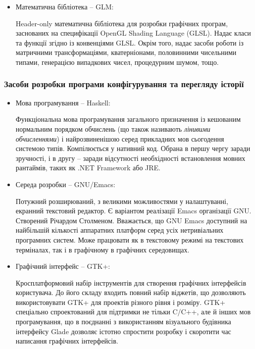 \begin{itemize}[label=\Large$\diamond$]
  \item Математична бібліотека -- GLM:

    Header-only математична бібліотека для розробки графічних програм, заснованих на специфікації OpenGL Shading Language (GLSL). Надає класи та функції згідно із конвенціями GLSL. Окрім того, надає засоби роботи із матричними трансформаціями, кватерніонами, половинними чисельними типами, генерацією випадкових чисел, процедурним шумом, тощо.

\end{itemize}

\subsubsection{Засоби розробки програми конфігурування та перегляду історії}
\begin{itemize}[label=\Large$\diamond$]\itemsep1em

  \item Мова програмування -- Haskell:

    Функціональна мова програмування загального призначення із кешованим нормальним порядком обчислень (що також називають \emph{лінивими обчисленнями}) і найрозвиненішою серед прикладних мов сьогодення системою типів. Компілюється у нативний код. Обрана в першу чергу заради зручності, і в другу -- заради відсутності необхідності встановлення мовних рантаймів, таких як .NET Framework або JRE.

  \item Середа розробки -- GNU/Emacs:

    Потужний розширюваний, з великими можливостями у налаштуванні, екранний текстовий редактор. Є варіантом реалізації Emacs організації GNU. Створений Річардом Столменом. Вважається, що GNU Emacs доступний на найбільшій кількості аппаратних платформ серед усіх нетривіальних програмних систем. Може працювати як в текстовому режимі на текстових терміналах, так і в графічному в графічних середовищах.

  \item Графічний інтерфейс -- GTK+:

    Кросплатформовий набір інструментів для створення графічних інтерфейсів користувача. До його складу входить повний набір віджетів, що дозволяють використовувати GTK+ для проектів різного рівня і розміру. GTK+ спеціально спроектований для підтримки не тільки C/C++, але й інших мов програмування, що в поєднанні з використанням візуального будівника інтерфейсу Glade дозволяє істотно спростити розробку і скоротити час написання графічних інтерфейсів.


\end{itemize}
